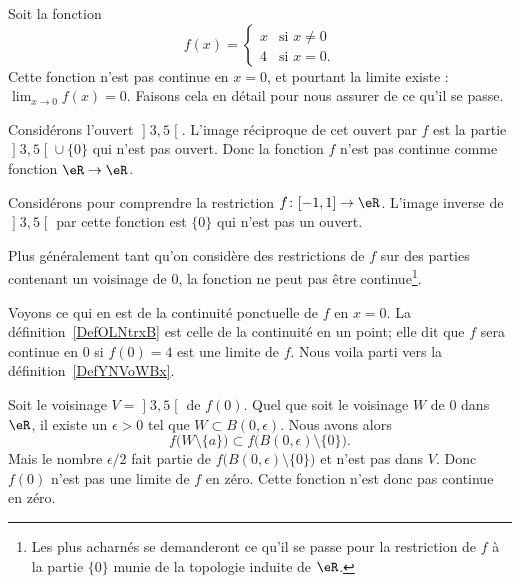 \begin{example}     \label{EXooKREUooLeuIlv}
    Soit la fonction
    \begin{equation}        \label{EQooSYSWooSGsUfR}
        f(x)=\begin{cases}
            x    &   \text{si } x\neq 0\\
            4    &    \text{si } x=0.
        \end{cases}
    \end{equation}
    Cette fonction n'est pas continue en \( x=0\), et pourtant la limite existe : \( \lim_{x\to 0} f(x)=0\). Faisons cela en détail pour nous assurer de ce qu'il se passe.

    Considérons l'ouvert \( \mathopen] 3 , 5 \mathclose[\). L'image réciproque de cet ouvert par \( f\) est la partie \( \mathopen] 3 , 5 \mathclose[\cup\{ 0 \}\) qui n'est pas ouvert. Donc la fonction \( f\) n'est pas continue comme fonction \( \eR\to \eR\).

    Considérons pour comprendre la restriction \( f\colon \mathopen[ -1 , 1 \mathclose]\to \eR\). L'image inverse de \( \mathopen] 3 , 5 \mathclose[\) par cette fonction est \( \{ 0 \}\) qui n'est pas un ouvert.

    Plus généralement tant qu'on considère des restrictions de \( f\) sur des parties contenant un voisinage de \( 0\), la fonction ne peut pas être continue\footnote{Les plus acharnés se demanderont ce qu'il se passe pour la restriction de \( f\) à la partie \( \{ 0 \}\) munie de la topologie induite de \( \eR\).}.

    Voyons ce qui en est de la continuité ponctuelle de \( f\) en \( x=0\). La définition~\ref{DefOLNtrxB} est celle de la continuité en un point; elle dit que \( f\) sera continue en \( 0\) si \( f(0)=4\) est une limite de \( f\). Nous voila parti vers la définition~\ref{DefYNVoWBx}.

Soit le voisinage \( V=\mathopen] 3 , 5 \mathclose[\) de \( f(0)\). Quel que soit le voisinage \( W\) de \( 0\) dans \( \eR\), il existe un \( \epsilon>0\) tel que \( W\subset B(0,\epsilon)\). Nous avons alors
    \begin{equation}
        f\big( W\setminus \{ a \} \big)\subset f\big( B(0,\epsilon)\setminus\{ 0 \} \big).
    \end{equation}
    Mais le nombre \( \epsilon/2\) fait partie de \( f\big( B(0,\epsilon)\setminus\{ 0 \} \big)\) et n'est pas dans \( V\). Donc \( f(0)\) n'est pas une limite de \( f\) en zéro. Cette fonction n'est donc pas continue en zéro.
\end{example}

